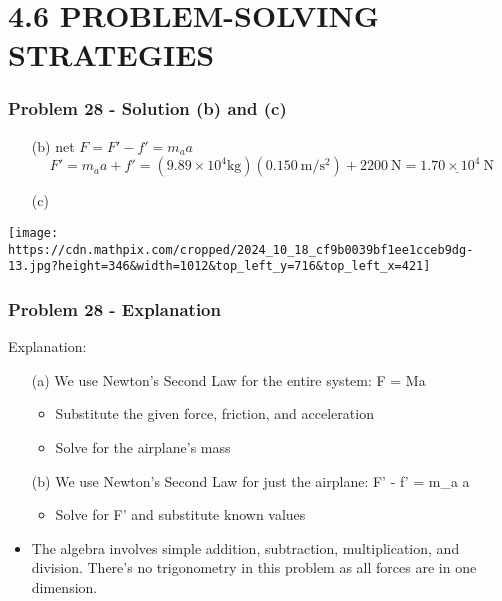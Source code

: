 \documentclass{beamer}
\begin{document}
\section{4.6 PROBLEM-SOLVING STRATEGIES}

\begin{frame}
\frametitle{Problem 28 - Solution (b) and (c)}
\begin{itemize}
    \item[(b)] net $F = F' - f' = m_a a$
    \begin{equation*}
    F' = m_a a + f' = (9.89 \times 10^{4} \mathrm{kg})(0.150 \mathrm{~m} / \mathrm{s}^{2}) + 2200 \mathrm{~N} = \underline{1.70 \times 10^{4} \mathrm{~N}}
    \end{equation*}
    \item[(c)]
\end{itemize}
\texttt{[image: https://cdn.mathpix.com/cropped/2024\_10\_18\_cf9b0039bf1ee1cceb9dg-13.jpg?height=346\&width=1012\&top\_left\_y=716\&top\_left\_x=421]}
\end{frame}

\begin{frame}
\frametitle{Problem 28 - Explanation}
Explanation:
\begin{itemize}
    \item[(a)] We use Newton's Second Law for the entire system: F = Ma
    \begin{itemize}
        \item Substitute the given force, friction, and acceleration
        \item Solve for the airplane's mass
    \end{itemize}
    \item[(b)] We use Newton's Second Law for just the airplane: F' - f' = m_a a
    \begin{itemize}
        \item Solve for F' and substitute known values
    \end{itemize}
    \item The algebra involves simple addition, subtraction, multiplication, and division. There's no trigonometry in this problem as all forces are in one dimension.
\end{itemize}
\end{frame}
\end{document}
